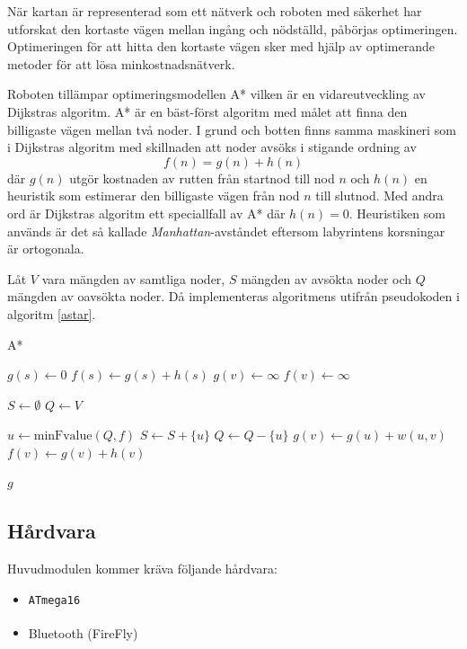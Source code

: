 \documentclass[11pt]{article}
\begin{document}
\begin{flushleft}
När kartan är representerad som ett nätverk och roboten med säkerhet har utforskat den kortaste vägen mellan ingång och nödställd, påbörjas optimeringen. Optimeringen för att hitta den kortaste vägen sker med hjälp av optimerande metoder för att lösa minkostnadsnätverk.

Roboten tillämpar optimeringsmodellen A* vilken är en vidareutveckling av Dijkstras algoritm. A* är en bäst-först algoritm med målet att finna den billigaste vägen mellan två noder. I grund och botten finns samma maskineri som i Dijkstras algoritm med skillnaden att noder avsöks i stigande ordning av
\begin{equation*}
	f(n) = g(n) + h(n)
\end{equation*}
där $g(n)$ utgör kostnaden av rutten från startnod till nod $n$ och $h(n)$ en heuristik som estimerar den billigaste vägen från nod $n$ till slutnod. Med andra ord är Dijkstras algoritm ett speciallfall av A* där $h(n) = 0$. Heuristiken som används är det så kallade \emph{Manhattan}-avståndet eftersom labyrintens korsningar är ortogonala.

Låt $V$ vara mängden av samtliga noder, $S$ mängden av avsökta noder och $Q$ mängden av oavsökta noder. Då implementeras algoritmens utifrån pseudokoden i algoritm \ref{astar}.

\begin{algorithm}[H]
	\caption{A*} \label{astar}
	\begin{algorithmic}[1]
			\State $g(s) \gets 0$
			\State $f(s) \gets g(s) + h(s)$
				\State $g(v) \gets \infty$
				\State $f(v) \gets \infty$
			\EndFor
			
			\State $S \gets \emptyset$
			\State $Q \gets V$
			
				\State $u \gets \textrm{minFvalue}(Q,f)$%
				\State $S \gets S +  \{ u\}$
				\State $Q \gets Q - \{ u\}$
						\State $g(v) \gets g(u) + w(u,v)$
						\State $f(v) \gets g(v) + h(v)$
					\EndIf
				\EndFor
			\EndWhile
			
			\Return $g$
		\EndFunction
	\end{algorithmic}
\end{algorithm}
  

\subsection{Hårdvara}
Huvudmodulen kommer kräva följande hårdvara:
\begin{itemize}
	\item \verb+ATmega16+
	\item  Bluetooth\textsuperscript{\circledR}  (FireFly)
\end{itemize}



\end{flushleft}
\end{document}
